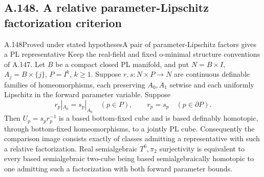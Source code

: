 \subsection{A.148. A relative parameter-Lipschitz factorization criterion}

\begin{saresult}{A.148}{Proved under stated hypotheses}{A pair of parameter-Lipschitz factors gives a PL representative}
Keep the real-field and fixed o-minimal structure conventions of A.147.
Let \(B\) be a compact closed PL manifold, and put
\(N=B\times I\), \(A_j=B\times\{j\}\), \(P=I^k\), \(k\ge1\).
Suppose \(r,s:N\times P\to N\) are continuous definable families of
homeomorphisms, each preserving \(A_0,A_1\) setwise and each uniformly
Lipschitz in the forward parameter variable. Suppose
\[
 r_p|_{A_0}=s_p|_{A_0}\quad(p\in P),\qquad
 r_p=s_p\quad(p\in\partial P).
 \tag{148.1}
\]
Then \(U_p=s_pr_p^{-1}\) is a based bottom-fixed cube and is based
definably homotopic, through bottom-fixed homeomorphisms, to a jointly
PL cube. Consequently the comparison image consists exactly of classes
admitting a representative with such a relative factorization.
Real semialgebraic \(T^6,\pi_2\) surjectivity is equivalent to every
based semialgebraic two-cube being based semialgebraically homotopic
to one admitting such a factorization with both forward parameter bounds.
\end{saresult}

